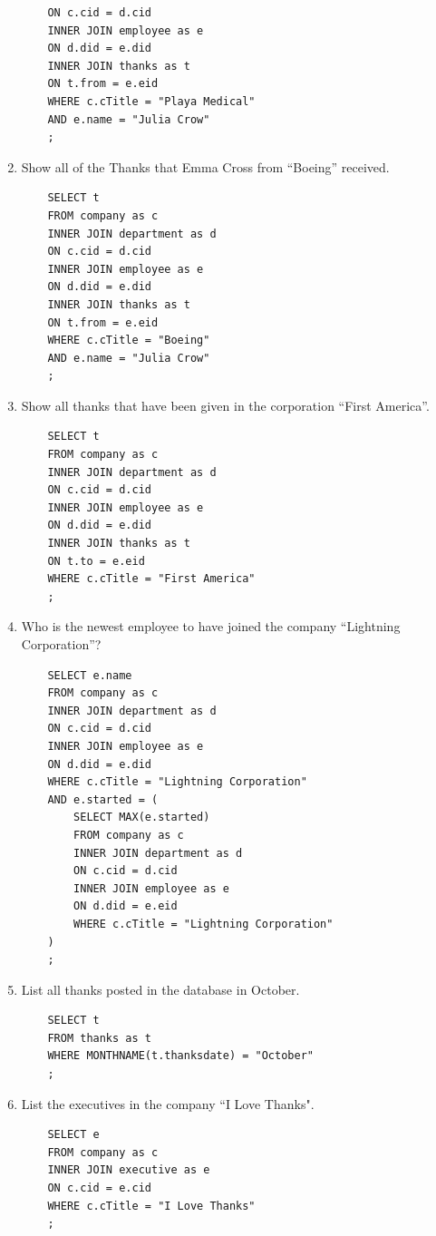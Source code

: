 \documentclass[11pt]{report}
\begin{document}
\begin{enumerate}
\begin{verbatim}
    ON c.cid = d.cid
    INNER JOIN employee as e
    ON d.did = e.did
    INNER JOIN thanks as t
    ON t.from = e.eid
    WHERE c.cTitle = "Playa Medical"
    AND e.name = "Julia Crow"
    ;
    \end{verbatim}
    \item Show all of the Thanks that Emma Cross from ``Boeing'' received.
    \begin{verbatim}
    SELECT t
    FROM company as c
    INNER JOIN department as d
    ON c.cid = d.cid
    INNER JOIN employee as e
    ON d.did = e.did
    INNER JOIN thanks as t
    ON t.from = e.eid
    WHERE c.cTitle = "Boeing"
    AND e.name = "Julia Crow"
    ;
    \end{verbatim}
    \item Show all thanks that have been given in the corporation ``First America''.
    \begin{verbatim}
    SELECT t
    FROM company as c
    INNER JOIN department as d
    ON c.cid = d.cid
    INNER JOIN employee as e
    ON d.did = e.did
    INNER JOIN thanks as t
    ON t.to = e.eid
    WHERE c.cTitle = "First America"
    ;
    \end{verbatim}
    \item Who is the newest employee to have joined the company ``Lightning Corporation''?
    \begin{verbatim}
    SELECT e.name
    FROM company as c
    INNER JOIN department as d
    ON c.cid = d.cid
    INNER JOIN employee as e
    ON d.did = e.did
    WHERE c.cTitle = "Lightning Corporation"
    AND e.started = (
        SELECT MAX(e.started)
        FROM company as c
        INNER JOIN department as d
        ON c.cid = d.cid
        INNER JOIN employee as e
        ON d.did = e.eid
        WHERE c.cTitle = "Lightning Corporation"
    )
    ;
    \end{verbatim}
    \item List all thanks posted in the database in October.
    \begin{verbatim}
    SELECT t
    FROM thanks as t
    WHERE MONTHNAME(t.thanksdate) = "October"
    ;
    \end{verbatim}
    \item List the executives in the company ``I Love Thanks".
    \begin{verbatim}
    SELECT e
    FROM company as c
    INNER JOIN executive as e
    ON c.cid = e.cid
    WHERE c.cTitle = "I Love Thanks"
    ;
    \end{verbatim}
\end{enumerate}
\clearpage
\end{document}
